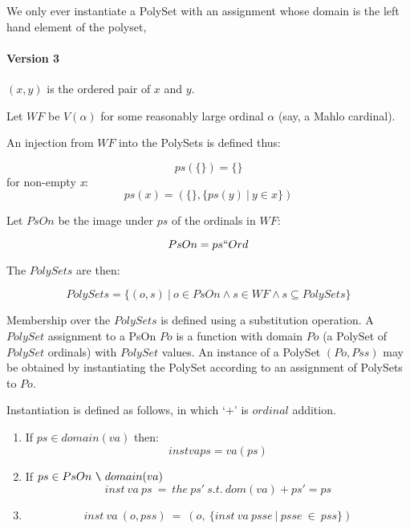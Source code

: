 \documentclass{article}
\begin{document}
\begin{article}
We only ever instantiate a PolySet with an assignment whose domain is the left hand element of the polyset,

\paragraph{Version 3}

$(x,y)$ is the ordered pair of $x$ and $y$.

Let $WF$ be $V(\alpha)$ for some reasonably large ordinal $\alpha$ (say, a Mahlo cardinal).

An injection from $WF$ into the PolySets is defined thus:

\begin{displaymath}
ps(\{\}) = \{\}
\end{displaymath}
for non-empty \emph{x}:
\begin{displaymath}
ps(x) = (\{\}, \{ ps(y)\ |\ y \in x\})
\end{displaymath}

Let $PsOn$ be the image under $ps$ of the ordinals in $WF$:

\begin{displaymath}
PsOn = ps `` Ord
\end{displaymath}

The $PolySets$ are then:

\begin{displaymath}
PolySets = \{(o,s)\ |\ o \in PsOn \land s \in WF \land s \subseteq PolySets\}
\end{displaymath}

Membership over the $PolySets$ is defined using a substitution operation.
A $PolySet$ assignment to a PsOn $Po$ is a function with domain $Po$ (a PolySet of $PolySet$ ordinals) with $PolySet$ values.
An instance of a PolySet $(Po, Pss)$ may be obtained by instantiating the PolySet according to an assignment of PolySets to $Po$.

Instantiation is defined as follows, in which `$+$' is $ordinal$ addition.

\begin{enumerate}
\item
If $ps \in domain(va)$ then:
\begin{displaymath}
 inst va ps = va (ps)
\end{displaymath}
\item
If $ps \in PsOn\ \verb!\!\ domain(va)$
\begin{displaymath}
 inst\ va\ ps\ =\ the\ ps'\ s.t.\ dom(va)+ps'=ps
\end{displaymath}
\item
\begin{displaymath}
inst\ va\ (o,pss)\ =\ (o,\ \{inst\ va\ psse\ |\ psse\ \in\ pss\})
\end{displaymath} 
\end{enumerate}


\end{article}
\end{document}
